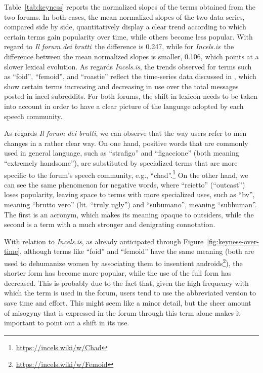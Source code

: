 \documentclass[11pt]{article}
\newcommand{\enforum}{\textit{Incels.is}}
\newcommand{\itforum}{\textit{Il forum dei brutti}}
\begin{document}
Table~\ref{tab:keyness} reports the normalized slopes of the terms obtained from the two forums. In both cases, the mean normalized slopes of the two data series, compared side by side, quantitatively display a clear trend according to which certain terms gain popularity over time, while others become less popular. With regard to \itforum\, the difference is 0.247, while for \enforum\, the difference between the mean normalized slopes is smaller, 0.106, which points at a slower lexical evolution. As regards \enforum, the trends observed for terms such as ``foid'', ``femoid'', and ``roastie'' reflect the time-series data discussed in , which show certain terms increasing and decreasing in use over the total messages posted in incel subreddits. For both forums, the shift in lexicon needs to be taken into account in order to have a clear picture of the language adopted by each speech community.

As regards \itforum, we can observe that the way users refer to men changes in a rather clear way. On one hand, positive words that are commonly used in general language, such as ``strafigo'' and ``figaccione'' (both meaning ``extremely handsome''), are substituted by specialized terms that are more specific to the forum's speech community, e.g., ``chad''.\footnote{\url{https://incels.wiki/w/Chad}} On the other hand, we can see the same phenomenon for negative words, where ``reietto'' (``outcast'') loses popularity, leaving space to terms with more specialized uses, such as ``bv'', meaning ``brutto vero'' (lit. ``truly ugly'') and ``subumano'', meaning ``subhuman''. The first is an acronym, which makes its meaning opaque to outsiders, while the second is a term with a much stronger and denigrating connotation.

With relation to \enforum, as already anticipated through Figure~\ref{fig:keyness-over-time}, although terms like ``foid'' and ``femoid'' have the same meaning (both are used to dehumanize women by associating them to insentient androids\footnote{\url{https://incels.wiki/w/Femoid}}), the shorter form has become more popular, while the use of the full form has decreased. This is probably due to the fact that, given the high frequency with which the term is used in the forum, users tend to use the abbreviated version to save time and effort. This might seem like a minor detail, but the sheer amount of misogyny that is expressed in the forum through this term alone makes it important to point out a shift in its use.
\end{document}
